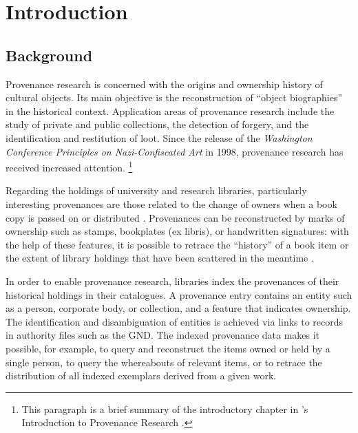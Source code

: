 \chapter{Introduction}
\label{chap:intro}

\section{Background}
\label{sec:background}

Provenance research is concerned with the origins and ownership history
of cultural objects. Its main objective is the reconstruction of
\enquote{object biographies} in the historical context.
Application areas of provenance research include
the study of private and public collections,
the detection of forgery,
and the identification and restitution of loot.
Since the release of the
\emph{Washington Conference Principles on Nazi-Confiscated Art} \autocite{WashingtonPrinciples}
in 1998,
provenance research has received increased attention.%
\footnote{%
  This paragraph is a brief summary of the introductory chapter in \citeauthor{Zuschlag2022}'s
  Introduction to Provenance Research \autocite*[§1]{Zuschlag2022}.%
}

Regarding the holdings of university and research libraries,
particularly interesting provenances are those related to the change of
owners when a book copy is passed on or distributed \autocite[p.\,2]{Hakelberg2016}.
Provenances can be reconstructed by marks of ownership
such as stamps, bookplates (ex libris), or handwritten signatures:
with the help of these features, it is possible to retrace
the \enquote{history} of a book item
or the extent of library holdings that have been scattered in the meantime \autocite[p.\,2]{Hakelberg2016}.

In order to enable provenance research,
libraries index the provenances of their historical holdings
in their catalogues.
A provenance entry contains an entity such as a person, corporate body, or collection,
and a feature that indicates ownership.
The identification and disambiguation of entities
is achieved via links to records in authority files such as the
\gls{GND}.
The indexed provenance data makes it possible, for example,
to query and reconstruct the items owned or held by a single person,
to query the whereabouts of relevant items,
or to retrace the distribution of all indexed exemplars derived from a given work.

